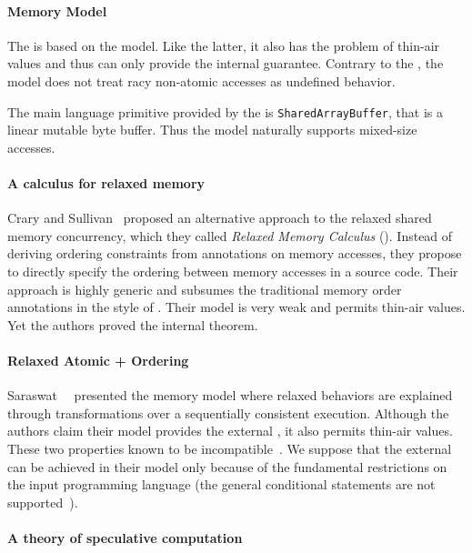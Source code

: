 \paragraph{\JS Memory Model}

The \JSMM is based on the \CMM model. 
Like the latter, it also has the problem of thin-air values
and thus can only provide the internal \DRF guarantee. 
Contrary to the \CMM, the \JS model does not treat 
racy non-atomic accesses as undefined behavior. 

The main language primitive provided by the \JSMM
is \texttt{SharedArrayBuffer}, that is a linear mutable byte buffer.
Thus the model naturally supports mixed-size accesses.

\paragraph{A calculus for relaxed memory}

Crary and Sullivan~\cite{Crary-Sullivan:POPL15} proposed 
an alternative approach to the relaxed shared memory concurrency,
which they called \emph{Relaxed Memory Calculus} (\RMC).
Instead of deriving ordering constraints from annotations 
on memory accesses, they propose to directly specify 
the ordering between memory accesses in a source code. 
Their approach is highly generic and subsumes 
the traditional memory order annotations in the style of \CMM.
Their model is very weak and permits thin-air values. 
Yet the authors proved the internal \DRF theorem.

\paragraph{Relaxed Atomic + Ordering}

Saraswat~\etal~\cite{Saraswat-al:PPoPP07} presented the \RAO memory model
where relaxed behaviors are explained through transformations 
over a sequentially consistent execution.
Although the authors claim their model provides the external \DRF,
it also permits thin-air values. 
These two properties known to be incompatible~\cite{Batty-al:ESOP15}.
We suppose that the external \DRF can be achieved in their model 
only because of the fundamental restrictions on the input programming language 
(\eg the general conditional statements are not supported~\cite{PichonPharabod-Sewell:POPL16}). 

\paragraph{A theory of speculative computation}

